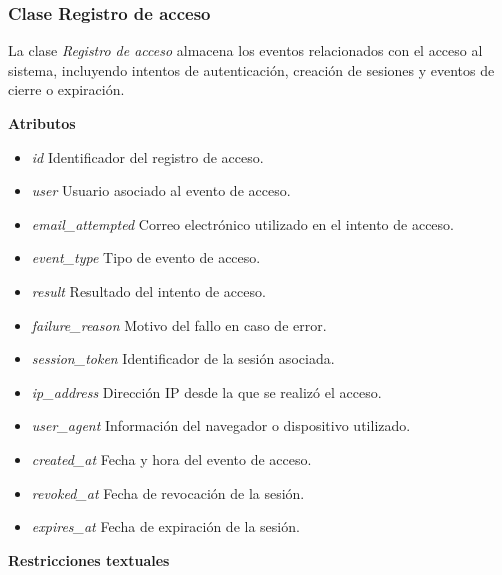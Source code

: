 \subsubsection{Clase Registro de acceso}

La clase \textit{Registro de acceso} almacena los eventos relacionados con el acceso al sistema, incluyendo intentos de autenticación, creación de sesiones y eventos de cierre o expiración.

\textbf{Atributos}

\begin{itemize}

      \item \textit{id}
            Identificador del registro de acceso.
      \item \textit{user}
            Usuario asociado al evento de acceso.
      \item \textit{email\_attempted}
            Correo electrónico utilizado en el intento de acceso.
      \item \textit{event\_type}
            Tipo de evento de acceso.
      \item \textit{result}
            Resultado del intento de acceso.
      \item \textit{failure\_reason}
            Motivo del fallo en caso de error.
      \item \textit{session\_token}
            Identificador de la sesión asociada.
      \item \textit{ip\_address}
            Dirección IP desde la que se realizó el acceso.
      \item \textit{user\_agent}
            Información del navegador o dispositivo utilizado.
      \item \textit{created\_at}
            Fecha y hora del evento de acceso.
      \item \textit{revoked\_at}
            Fecha de revocación de la sesión.
      \item \textit{expires\_at}
            Fecha de expiración de la sesión.

\end{itemize}

\textbf{Restricciones textuales}

